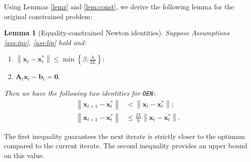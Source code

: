 \documentclass[journal,twoside,web]{ieeecolor}
\newtheorem{lemma}{Lemma}
\newcommand{\norm}[1]{\left\lVert#1\right\rVert}
\newcommand{\xx}{\mathbf{x}}
\newcommand{\bb}{\mathbf{b}}
\renewcommand{\AA}{\mathbf{A}}
\begin{document}
Using Lemmas \ref{lemz} and \ref{lem:const}, we derive the following lemma for the original constrained problem:
\begin{lemma}[Equality-constrained Newton identities]
\label{lem:ECN}
Suppose Assumptions \ref{ass:inv}, \ref{ass:lip} hold and:
\begin{enumerate}
    \item $\norm{\xx_t-\xx_t^*}\le \min \left\{\beta, \frac{h}{2L}\right\};$
    \item $\AA_t\xx_t-\bb_t=\mathbf{0}.$
\end{enumerate}
    Then we have the following two identities for \texttt{OEN}:
    \begin{align}
    \label{id:1}
    \norm{\xx_{t+1}-\xx_t^*} &< \norm{\xx_t-\xx_t^*};\\
    \label{id:2}
    \norm{\xx_{t+1}-\xx_t^*} &\le \frac{2L}{h}\norm{\xx_t-\xx_t^*}.
\end{align}
\end{lemma}
{The first inequality guarantees the next iterate is strictly closer to the optimum compared to the current iterate. The second inequality provides an upper bound on this value.}
\end{document}

